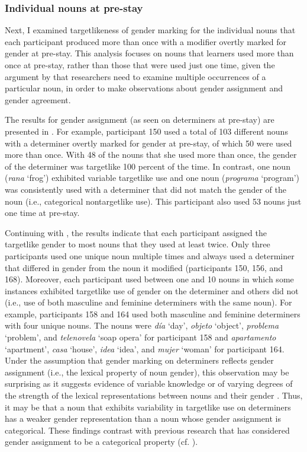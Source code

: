 \documentclass[output=paper,colorlinks,citecolor=brown,modfonts,nonflat]{../langscibook}
\begin{document}
\subsubsection{Individual nouns at pre-stay}\label{sec:gudmestad:3.2.2}

Next, I examined targetlikeness of gender marking for the individual nouns that each participant produced more than once with a modifier overtly marked for gender at pre-stay.  This analysis focuses on nouns that learners used more than once at pre-stay, rather than those that were used just one time, given the argument by \citet[242]{Gudmundson2013} that researchers need to examine multiple occurrences of a particular noun, in order to make observations about gender assignment and gender agreement. 



The results for gender assignment (as seen on determiners at pre-stay) are presented in . For example, participant 150 used a total of 103 different nouns with a determiner overtly marked for gender at pre-stay, of which 50 were used more than once. With 48 of the nouns that she used more than once, the gender of the determiner was targetlike 100 percent of the time. In contrast, one noun (\textit{rana} ‘frog’) exhibited variable targetlike use and one noun (\textit{programa} ‘program’) was consistently used with a determiner that did not match the gender of the noun (i.e., categorical nontargetlike use). This participant also used 53 nouns just one time at pre-stay.



Continuing with , the results indicate that each participant assigned the targetlike gender to most nouns that they used at least twice. Only three participants used one unique noun multiple times and always used a determiner that differed in gender from the noun it modified (participants 150, 156, and 168). Moreover, each participant used between one and 10 nouns in which some instances exhibited targetlike use of gender on the determiner and others did not (i.e., use of both masculine and feminine determiners with the same noun). For example, participants 158 and 164 used both masculine and feminine determiners with four unique nouns. The nouns were \textit{día} ‘day’, \textit{objeto} ‘object’, \textit{problema} ‘problem’, and \textit{telenovela} ‘soap opera’ for participant 158 and \textit{apartamento} ‘apartment’, \textit{casa} ‘house’, \textit{idea} ‘idea’, and \textit{mujer} ‘woman’ for participant 164. Under the assumption that gender marking on determiners reflects gender assignment (i.e., the lexical property of noun gender), this observation may be surprising as it suggests evidence of variable knowledge or of varying degrees of the strength of the lexical representations between nouns and their gender \citep{HalberstadtEtAl2018}. Thus, it may be that a noun that exhibits variability in targetlike use on determiners has a weaker gender representation than a noun whose gender assignment is categorical. These findings contrast with previous research that has considered gender assignment to be a categorical property (cf. \citealt{Alarcón2010}).
\end{document}
